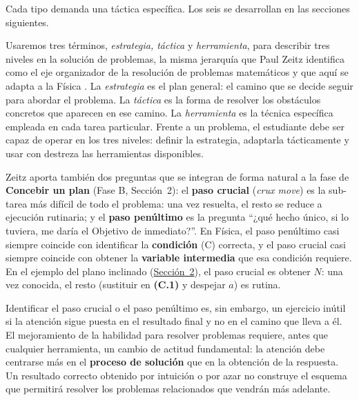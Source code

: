 \documentclass[11pt]{book}
\begin{document}
Cada tipo demanda una táctica específica. Los seis se desarrollan en las secciones siguientes.

\medskip
{}

\medskip
\noindent Usaremos tres términos, {\it estrategia, táctica} y {\it herramienta}, para describir tres niveles en la solución de problemas, la misma jerarquía que Paul Zeitz identifica como el eje organizador de la resolución de problemas matemáticos y que aquí se adapta a la Física \cite{Zeitz2006}. La {\it estrategia} es el plan general: el camino que se decide seguir para abordar el problema. La {\it táctica} es la forma de resolver los obstáculos concretos que aparecen en ese camino. La {\it herramienta} es la técnica específica empleada en cada tarea particular. Frente a un problema, el estudiante debe ser capaz de operar en los tres niveles: definir la estrategia, adaptarla tácticamente y usar con destreza las herramientas disponibles.

\medskip
\noindent Zeitz \cite{Zeitz2006} aporta también dos preguntas que se integran de forma natural a la fase de {\bf Concebir un plan} (Fase B, Sección~2): el {\bf paso crucial} (\textit{crux move}) es la sub-tarea más difícil de todo el problema: una vez resuelta, el resto se reduce a ejecución rutinaria; y el {\bf paso penúltimo} es la pregunta ``¿qué hecho único, si lo tuviera, me daría el Objetivo de inmediato?''. En Física, el paso penúltimo casi siempre coincide con identificar la {\bf condición} (C) correcta, y el paso crucial casi siempre coincide con obtener la {\bf variable intermedia} que esa condición requiere. En el ejemplo del plano inclinado (\hyperref[ex:planoinclinado]{Sección~2}), el paso crucial es obtener $N$: una vez conocida, el resto (sustituir en \textbf{(C.1)} y despejar $a$) es rutina.

\medskip
Identificar el paso crucial o el paso penúltimo es, sin embargo, un ejercicio inútil si la atención sigue puesta en el resultado final y no en el camino que lleva a él. El mejoramiento de la habilidad para resolver problemas requiere, antes que cualquier herramienta, un cambio de actitud fundamental: la atención debe centrarse más en el {\bf proceso de solución} que en la obtención de la respuesta. Un resultado correcto obtenido por intuición o por azar no construye el esquema que permitirá resolver los problemas relacionados que vendrán más adelante.
\end{document}
